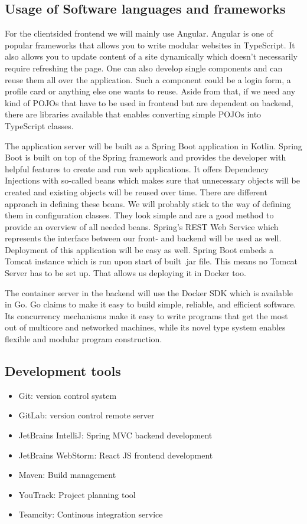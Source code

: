 \documentclass[a4paper,12pt,chapterprefix=false,bibliography=totoc,listof=totoc,]{scrreprt}
\begin{document}
\subsection{{\color{magenta} Usage of Software languages and frameworks}}
{\color{magenta}
For the clientsided frontend we will mainly use Angular. Angular is one of popular frameworks that allows you to write modular websites in TypeScript. It also allows you to update content of a site dynamically which doesn't necessarily require refreshing the page. One can also develop single components and can reuse them all over the application. Such a component could be a login form, a profile card or anything else one wants to reuse. Aside from that, if we need any kind of POJOs that have to be used in frontend but are dependent on backend, there are libraries available that enables converting simple POJOs into TypeScript classes.

The application server will be built as a Spring Boot application in Kotlin. Spring Boot is built on top of the Spring framework and provides the developer with helpful features to create and run web applications. It offers Dependency Injections with so-called beans which makes sure that unnecessary objects will be created and existing objects will be reused over time. There are different approach in defining these beans. We will probably stick to the way of defining them in configuration classes. They look simple and are a good method to provide an overview of all needed beans. Spring's REST Web Service which represents the interface between our front- and backend will be used as well. Deployment of this application will be easy as well. Spring Boot embeds a Tomcat instance which is run upon start of built .jar file. This means no Tomcat Server has to be set up. That allows us deploying it in Docker too.

The container server in the backend will use the Docker SDK which is available in Go. Go claims to make it easy to build simple, reliable, and efficient software. Its concurrency mechanisms make it easy to write programs that get the most out of multicore and networked machines, while its novel type system enables flexible and modular program construction.
}

\subsection{{\color{magenta} Development tools}}
{\color{magenta}
\begin{itemize}
    \item Git: version control system
    \item GitLab: version control remote server
    \item JetBrains IntelliJ: Spring MVC backend development
    \item JetBrains WebStorm: React JS frontend development
    \item Maven: Build management
    \item YouTrack: Project planning tool
    \item Teamcity: Continous integration service
\end{itemize}
}
\end{document}
